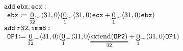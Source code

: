 \[
\begin{array}{llcl}
\mathtt{add\hspace{0.5ex} ebx, ecx}:  \\
  \hspace{1ex}\mathtt{ebx} \coloneqq \bitmoded{32}{0} {_\smile} \langle 31,0\rangle(\bitmoded{1}{0} {_\smile} \langle 31,0\rangle\mathtt{ecx} + \bitmoded{1}{0} {_\smile} \langle 31,0\rangle\mathtt{ebx}) \\
 
\mathtt{add\hspace{0.5ex}} \mathtt{r32,imm8}: \\
   \hspace{1ex} \mathtt{OP1} \hspace{-0.5ex}\coloneqq \bitmoded{32}{0} {_\smile} \langle 31,0\rangle(\bitmoded{1}{0} {_\smile} \langle 31,0\rangle\bitmoded{32}{\sextend(\mathtt{OP2})} + \bitmoded{1}{0} {_\smile} \langle 31,0\rangle\mathtt{OP1})\\ 
\end{array}
\]
